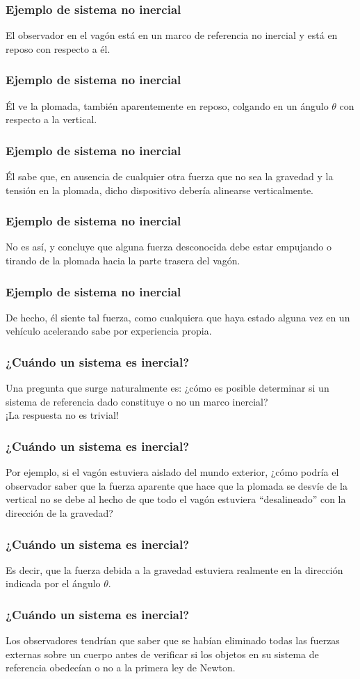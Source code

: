 \documentclass[12pt]{beamer}
\begin{document}
\begin{frame}
\frametitle{Ejemplo de sistema no inercial}
El observador en el vagón está en un marco de referencia no inercial \pause y está en reposo con respecto a él.
\end{frame}
\begin{frame}
\frametitle{Ejemplo de sistema no inercial}
Él ve la plomada, también aparentemente en reposo, colgando en un ángulo $\theta$ con respecto a la vertical.
\end{frame}
\begin{frame}
\frametitle{Ejemplo de sistema no inercial}
Él sabe que, en ausencia de cualquier otra fuerza que no sea la gravedad y la tensión en la plomada, dicho dispositivo debería alinearse verticalmente.
\end{frame}
\begin{frame}
\frametitle{Ejemplo de sistema no inercial}
No es así, y concluye que alguna fuerza desconocida debe estar empujando o tirando de la plomada hacia la parte trasera del vagón.
\end{frame}
\begin{frame}
\frametitle{Ejemplo de sistema no inercial}
De hecho, él siente tal fuerza, como cualquiera que haya estado alguna vez en un vehículo acelerando sabe por experiencia propia.
\end{frame}
\begin{frame}
\frametitle{¿Cuándo un sistema es inercial?}
Una pregunta que surge naturalmente es: ¿cómo es posible determinar si un sistema de referencia dado constituye o no un marco inercial?
\\
\bigskip
\pause 
¡La respuesta no es trivial!
\end{frame}
\begin{frame}
\frametitle{¿Cuándo un sistema es inercial?}
Por ejemplo, si el vagón estuviera aislado del mundo exterior, \pause ¿cómo podría el observador saber que la fuerza aparente que hace que la plomada se desvíe de la vertical no se debe al hecho de que todo el vagón estuviera \enquote{desalineado} con la dirección de la gravedad?
\end{frame}
\begin{frame}
\frametitle{¿Cuándo un sistema es inercial?}
Es decir, que la fuerza debida a la gravedad estuviera realmente en la dirección indicada por el ángulo $\theta$.
\end{frame}
\begin{frame}
\frametitle{¿Cuándo un sistema es inercial?}
Los observadores tendrían que saber que se habían eliminado todas las fuerzas externas sobre un cuerpo antes de verificar si los objetos en su sistema de referencia obedecían o no a la primera ley de Newton.
\end{frame}
\end{document}
